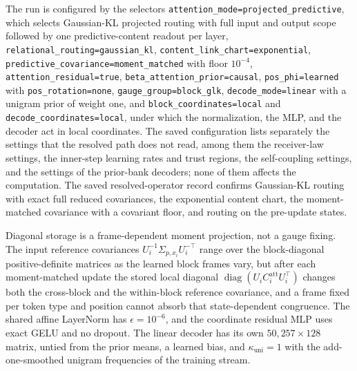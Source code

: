 \documentclass[twoside,11pt]{article}
\begin{document}
{\raggedright
The run is configured by the selectors \texttt{attention\_\allowbreak mode=\allowbreak projected\_\allowbreak predictive}, which selects Gaussian-KL projected routing with full input and output scope followed by one predictive-content readout per layer, \texttt{relational\_\allowbreak routing=\allowbreak gaussian\_\allowbreak kl}, \texttt{content\_\allowbreak link\_\allowbreak chart=\allowbreak exponential}, \texttt{predictive\_\allowbreak covariance=\allowbreak moment\_\allowbreak matched} with floor $10^{-4}$, \texttt{attention\_\allowbreak residual=\allowbreak true}, \texttt{beta\_\allowbreak attention\_\allowbreak prior=\allowbreak causal}, \texttt{pos\_\allowbreak phi=\allowbreak learned} with \texttt{pos\_\allowbreak rotation=\allowbreak none}, \texttt{gauge\_\allowbreak group=\allowbreak block\_\allowbreak glk}, \texttt{decode\_\allowbreak mode=\allowbreak linear} with a unigram prior of weight one, and \texttt{block\_\allowbreak coordinates=\allowbreak local} and \texttt{decode\_\allowbreak coordinates=\allowbreak local}, under which the normalization, the MLP, and the decoder act in local coordinates. %
The saved configuration lists separately the settings that the resolved path does not read, among them the receiver-law settings, the inner-step learning rates and trust regions, the self-coupling settings, and the settings of the prior-bank decoders; none of them affects the computation. %
The saved resolved-operator record confirms Gaussian-KL routing with exact full reduced covariances, the exponential content chart, the moment-matched covariance with a covariant floor, and routing on the pre-update states. %
\par}

Diagonal storage is a frame-dependent moment projection, not a gauge fixing. The input reference covariances $U_i^{-1}\Sigma_{p,x_i}U_i^{-\top}$ range over the block-diagonal positive-definite matrices as the learned block frames vary, but after each moment-matched update the stored local diagonal $\operatorname{diag}(U_iC_i^{\mathrm{att}}U_i^\top)$ changes both the cross-block and the within-block reference covariance, and a frame fixed per token type and position cannot absorb that state-dependent congruence. The shared affine LayerNorm \citep{ba2016layernorm} has $\epsilon=10^{-6}$, and the coordinate residual MLP uses exact GELU and no dropout. %
The linear decoder has its own $50{,}257\times128$ matrix, untied from the prior means, a learned bias, and $\kappa_{\mathrm{uni}}=1$ with the add-one-smoothed unigram frequencies of the training stream. %
\end{document}

